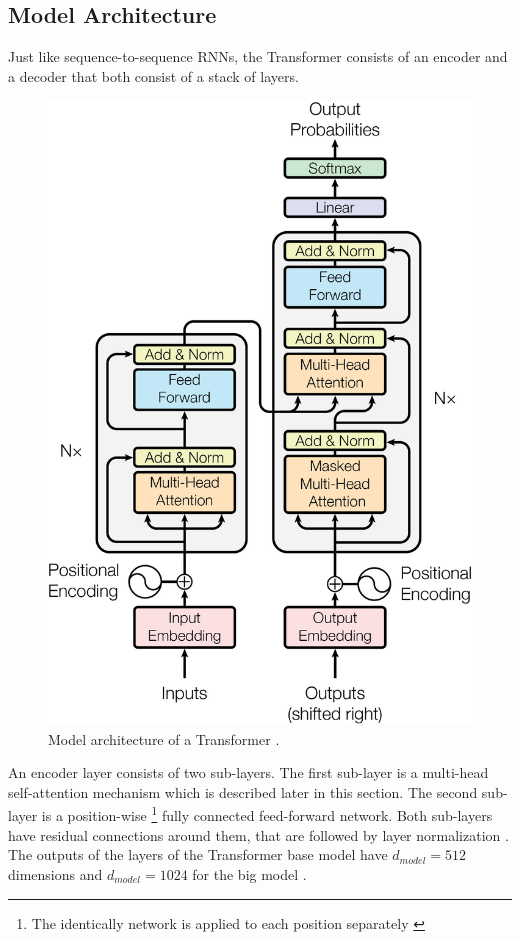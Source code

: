 \subsection{Model Architecture}\label{ssec:transformer-model-architecture}

Just like sequence-to-sequence RNNs, the Transformer consists of an encoder and a decoder that both consist of a stack of layers.

\begin{figure}[h]
\centering
\includegraphics{figures/transformer-model}
\caption[Model architecture of a Transformer]{Model architecture of a Transformer \cite[p.~3]{1706.03762}.}
\label{fig:transformer-model}
\end{figure}

An encoder layer consists of two sub-layers.
The first sub-layer is a multi-head self-attention mechanism which is described later in this section.
The second sub-layer is a position-wise \footnote{The identically network is applied to each position separately \cite[p.~5]{1706.03762}} fully connected feed-forward network.
Both sub-layers have residual connections \cite{1512.03385} around them, that are followed by layer normalization \cite{1607.06450}.
The outputs of the layers of the Transformer base model have $d_{model}=512$ dimensions and $d_{model}=1024$ for the big model \cite[p.~9]{1706.03762}.

